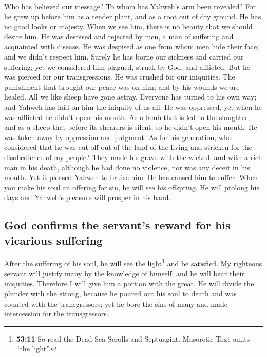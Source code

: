  Who has believed our message? To whom has Yahweh's arm
been revealed?  For he grew up before him as a tender
plant, and as a root out of dry ground. He has no good looks or majesty.
When we see him, there is no beauty that we should desire him.
 He was despised and rejected by men, a man of suffering
and acquainted with disease. He was despised as one from whom men hide
their face; and we didn't respect him.  Surely he has
borne our sickness and carried our suffering; yet we considered him
plagued, struck by God, and afflicted.  But he was pierced
for our transgressions. He was crushed for our iniquities. The
punishment that brought our peace was on him; and by his wounds we are
healed.  All we like sheep have gone astray. Everyone has
turned to his own way; and Yahweh has laid on him the iniquity of us
all.  He was oppressed, yet when he was afflicted he
didn't open his mouth. As a lamb that is led to the slaughter, and as a
sheep that before its shearers is silent, so he didn't open his mouth.
 He was taken away by oppression and judgment. As for his
generation, who considered that he was cut off out of the land of the
living and stricken for the disobedience of my people? 
They made his grave with the wicked, and with a rich man in his death,
although he had done no violence, nor was any deceit in his mouth.
 Yet it pleased Yahweh to bruise him. He has caused him
to suffer. When you make his soul an offering for sin, he will see his
offspring. He will prolong his days and Yahweh's pleasure will prosper
in his hand.

\hypertarget{god-confirms-the-servants-reward-for-his-vicarious-suffering}{%
\subsection{God confirms the servant's reward for his vicarious
suffering}\label{god-confirms-the-servants-reward-for-his-vicarious-suffering}}

 After the suffering of his soul, he will see the
light\footnote{\textbf{53:11} So read the Dead Sea Scrolls and
  Septuagint. Masoretic Text omits ``the light''.} and be satisfied. My
righteous servant will justify many by the knowledge of himself; and he
will bear their iniquities.  Therefore I will give him a
portion with the great. He will divide the plunder with the strong,
because he poured out his soul to death and was counted with the
transgressors; yet he bore the sins of many and made intercession for
the transgressors.

